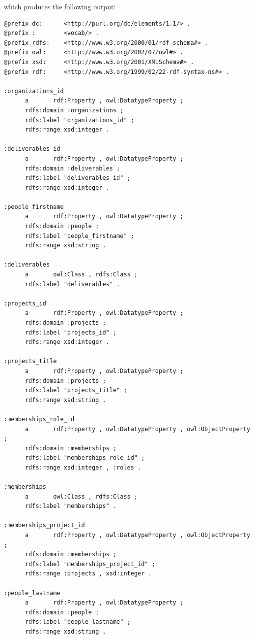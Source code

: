 \documentclass[11pt]{llncs}
\begin{document}
which produces the following output:

\begin{lstlisting}
@prefix dc:      <http://purl.org/dc/elements/1.1/> .
@prefix :        <vocab/> .
@prefix rdfs:    <http://www.w3.org/2000/01/rdf-schema#> .
@prefix owl:     <http://www.w3.org/2002/07/owl#> .
@prefix xsd:     <http://www.w3.org/2001/XMLSchema#> .
@prefix rdf:     <http://www.w3.org/1999/02/22-rdf-syntax-ns#> .

:organizations_id
      a       rdf:Property , owl:DatatypeProperty ;
      rdfs:domain :organizations ;
      rdfs:label "organizations_id" ;
      rdfs:range xsd:integer .

:deliverables_id
      a       rdf:Property , owl:DatatypeProperty ;
      rdfs:domain :deliverables ;
      rdfs:label "deliverables_id" ;
      rdfs:range xsd:integer .

:people_firstname
      a       rdf:Property , owl:DatatypeProperty ;
      rdfs:domain :people ;
      rdfs:label "people_firstname" ;
      rdfs:range xsd:string .

:deliverables
      a       owl:Class , rdfs:Class ;
      rdfs:label "deliverables" .

:projects_id
      a       rdf:Property , owl:DatatypeProperty ;
      rdfs:domain :projects ;
      rdfs:label "projects_id" ;
      rdfs:range xsd:integer .

:projects_title
      a       rdf:Property , owl:DatatypeProperty ;
      rdfs:domain :projects ;
      rdfs:label "projects_title" ;
      rdfs:range xsd:string .

:memberships_role_id
      a       rdf:Property , owl:DatatypeProperty , owl:ObjectProperty ;
      rdfs:domain :memberships ;
      rdfs:label "memberships_role_id" ;
      rdfs:range xsd:integer , :roles .

:memberships
      a       owl:Class , rdfs:Class ;
      rdfs:label "memberships" .

:memberships_project_id
      a       rdf:Property , owl:DatatypeProperty , owl:ObjectProperty ;
      rdfs:domain :memberships ;
      rdfs:label "memberships_project_id" ;
      rdfs:range :projects , xsd:integer .

:people_lastname
      a       rdf:Property , owl:DatatypeProperty ;
      rdfs:domain :people ;
      rdfs:label "people_lastname" ;
      rdfs:range xsd:string .


\end{lstlisting}
\end{document}

